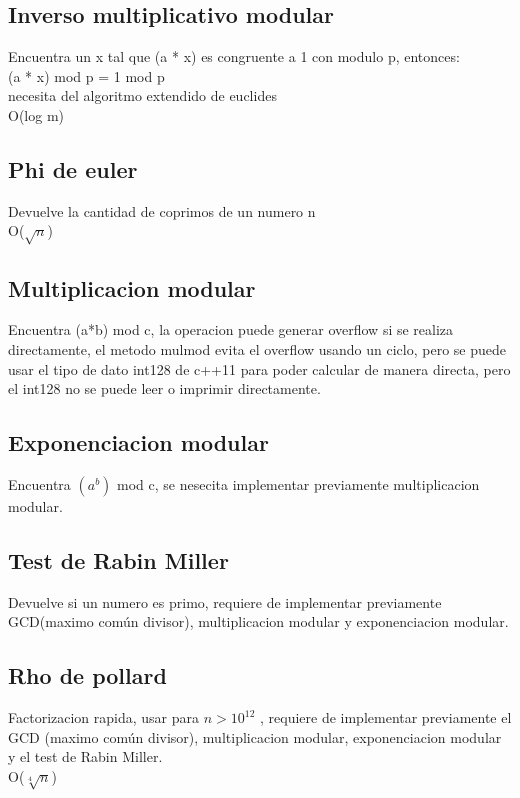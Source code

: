 \documentclass[10pt,landscape,twocolumn,a4paper,notitlepage]{article}
\newcommand\cppfile[2][]{

}
\begin{document}
			\subsection{Inverso multiplicativo modular}
			Encuentra un x tal que (a * x) es congruente a 1 con modulo p,
				entonces:\\ (a * x) mod p = 1 mod p\\
				necesita del algoritmo extendido de euclides\\
			O(log m)
			\cppfile[17-27]{matematicas/inverso_multiplicativo_modular.cpp}
			\subsection{Phi de euler}
			Devuelve la cantidad de coprimos de un numero n\\
			O($\sqrt{n}$)
			\cppfile[5-16]{matematicas/phi_de_euler.cpp}
			\subsection{Multiplicacion modular}
			Encuentra (a*b) mod c, la operacion puede generar overflow
				si se realiza directamente, el metodo mulmod evita el overflow usando un
				ciclo, pero se puede usar el tipo de dato int128 de c++11 para poder calcular
				de manera directa, pero el int128 no se puede leer o imprimir directamente.
			\cppfile[5-26]{matematicas/multiplicacion_modular.cpp}
			\subsection{Exponenciacion modular}
			Encuentra $(a^b)$ mod c, se nesecita implementar previamente multiplicacion modular.
			\cppfile[16-20]{matematicas/exp_modular.cpp}
			\subsection{Test de Rabin Miller}
			Devuelve si un numero es primo, requiere de implementar previamente GCD(maximo común divisor),
			multiplicacion modular y exponenciacion modular.
			\cppfile[29-52]{matematicas/test_de_rabin_miller.cpp}
			\subsection{Rho de pollard}
			Factorizacion rapida, usar para $n > 10^{12}$ , requiere de implementar previamente el GCD
			(maximo común divisor), multiplicacion modular,	exponenciacion modular y el test de Rabin Miller.\\
			O($\sqrt[4]{n}$)
			\cppfile[54-92]{matematicas/rho_de_pollard.cpp}
\end{document}
